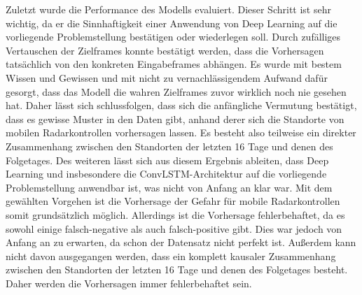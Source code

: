 Zuletzt wurde die Performance des Modells evaluiert.
Dieser Schritt ist sehr wichtig, da er die Sinnhaftigkeit einer Anwendung von Deep Learning auf die vorliegende Problemstellung bestätigen oder wiederlegen soll.
Durch zufälliges Vertauschen der Zielframes konnte bestätigt werden, dass die Vorhersagen tatsächlich von den konkreten Eingabeframes abhängen.
Es wurde mit bestem Wissen und Gewissen und mit nicht zu vernachlässigendem Aufwand dafür gesorgt, dass das Modell die wahren Zielframes zuvor wirklich noch nie gesehen hat.
Daher lässt sich schlussfolgen, dass sich die anfängliche Vermutung bestätigt, dass es gewisse Muster in den Daten gibt, anhand derer sich die Standorte von mobilen Radarkontrollen vorhersagen lassen.
Es besteht also teilweise ein direkter Zusammenhang zwischen den Standorten der letzten 16 Tage und denen des Folgetages.
Des weiteren lässt sich aus diesem Ergebnis ableiten, dass Deep Learning und insbesondere die ConvLSTM-Architektur auf die vorliegende Problemstellung anwendbar ist, was nicht von Anfang an klar war.
Mit dem gewählten Vorgehen ist die Vorhersage der Gefahr für mobile Radarkontrollen somit grundsätzlich möglich.
Allerdings ist die Vorhersage fehlerbehaftet, da es sowohl einige falsch-negative als auch falsch-positive gibt.
Dies war jedoch von Anfang an zu erwarten, da schon der Datensatz nicht perfekt ist.
Außerdem kann nicht davon ausgegangen werden, dass ein komplett kausaler Zusammenhang zwischen den Standorten der letzten 16 Tage und denen des Folgetages besteht.
Daher werden die Vorhersagen immer fehlerbehaftet sein.

